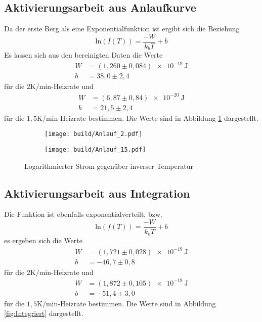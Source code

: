 \subsection{Aktivierungsarbeit aus Anlaufkurve}
Da der erste Berg als eine Exponentialfunktion ist ergibt sich die Beziehung
\begin{equation}
  \text{ln}(I(T)) = \frac{-W}{k_bT} + b
\end{equation}
Es lassen sich aus den bereinigten Daten die Werte
\begin{align}
  W &= (1,260\pm 0,084)\SI{e-19}{\joule}\nonumber\\
  b &= 38,0\pm 2,4
\end{align}
für die $2\si{\kelvin\per\minute}$-Heizrate und
\begin{align}
  W &= (6,87\pm 0,84)\SI{e-20}{\joule}\nonumber\\
  b &= 21,5\pm 2,4
\end{align}
für die $1,5\si{\kelvin\per\minute}$-Heizrate bestimmen.
Die Werte sind in Abbildung \ref{fig:Anlauf} dargestellt.

\begin{figure}
  \centering
  \begin{subfigure}{0.4\textwidth}
    \centering
    \texttt{[image: build/Anlauf\_2.pdf]}
  \end{subfigure}
  \begin{subfigure}{0.4\textwidth}
    \centering
    \texttt{[image: build/Anlauf\_15.pdf]}
  \end{subfigure}
  \caption{Logarithmierter Strom gegenüber inverser Temperatur}
  \label{fig:Anlauf}
\end{figure}

\subsection{Aktivierungsarbeit aus Integration}
Die Funktion ist ebenfalls exponentialverteilt, bzw.
\begin{equation}
  \text{ln}(f(T)) = \frac{-W}{k_bT} + b
\end{equation}
es ergeben sich die Werte
\begin{align}
  W &= (1,721\pm 0,028)\SI{e-19}{\joule}\nonumber\\
  b &= -46,7\pm 0,8
\end{align}
für die $2\si{\kelvin\per\minute}$-Heizrate und
\begin{align}
  W &= (1,872\pm 0,105)\SI{e-19}{\joule}\nonumber\\
  b &= -51,4\pm 3,0
\end{align}
für die $1,5\si{\kelvin\per\minute}$-Heizrate bestimmen.
Die Werte sind in Abbildung \ref{fig:Integriert} dargestellt.

